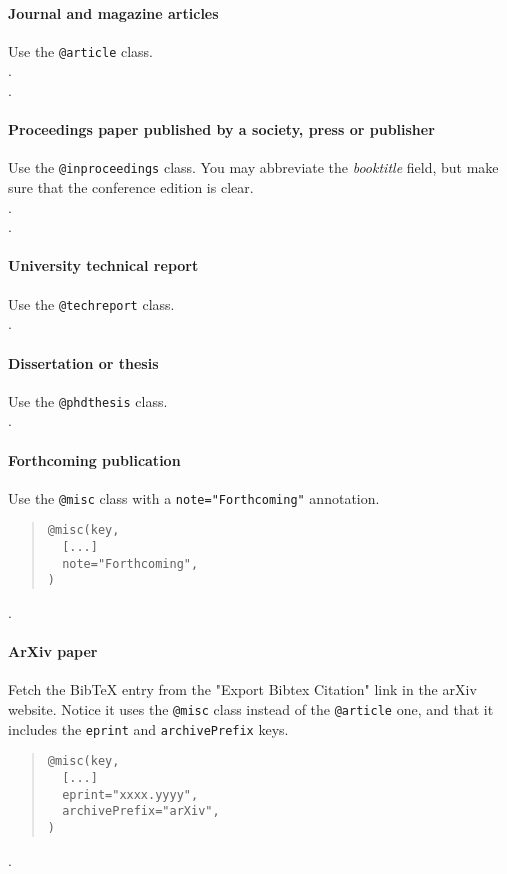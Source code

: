 \documentclass[letterpaper]{article} %
\begin{document}
\paragraph{Journal and magazine articles~\nocite{r:80, hcr:83}} Use the \texttt{@article} class.\\[.2em]
.\\[.2em]
.

\paragraph{Proceedings paper published by a society, press or publisher~\nocite{c:83, c:84}} Use the \texttt{@inproceedings} class. You may abbreviate the \emph{booktitle} field, but make sure that the conference edition is clear.\\[.2em]
.\\[.2em]
.

\paragraph{University technical report~\nocite{r:86}} Use the \texttt{@techreport} class.\\[.2em]
.

\paragraph{Dissertation or thesis~\nocite{c:79}} Use the \texttt{@phdthesis} class.\\[.2em]
.

\paragraph{Forthcoming publication~\nocite{c:21}} Use the \texttt{@misc} class with a \texttt{note="Forthcoming"} annotation.
\begin{quote}
\begin{footnotesize}
\begin{verbatim}
@misc(key,
  [...]
  note="Forthcoming",
)
\end{verbatim}
\end{footnotesize}
\end{quote}
.

\paragraph{ArXiv paper~\nocite{c:22}} Fetch the BibTeX entry from the "Export Bibtex Citation" link in the arXiv website. Notice it uses the \texttt{@misc} class instead of the \texttt{@article} one, and that it includes the \texttt{eprint} and \texttt{archivePrefix} keys.
\begin{quote}
\begin{footnotesize}
\begin{verbatim}
@misc(key,
  [...]
  eprint="xxxx.yyyy",
  archivePrefix="arXiv",
)
\end{verbatim}
\end{footnotesize}
\end{quote}
.
\end{document}

